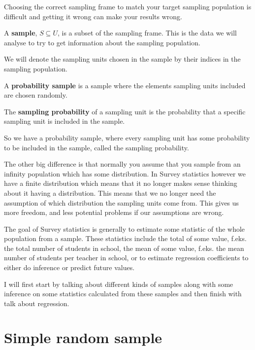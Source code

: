 \documentclass{article}
\begin{document}
Choosing the correct sampling frame to match your target sampling population is
difficult and getting it wrong can make your results wrong.


\begin{definition} \label{def:sample}
A \textbf{sample}, $S \subseteq U$, is a subset of the sampling frame. This is the data we will analyse to try to get information about the sampling population.
\end{definition}

We will denote the sampling units chosen in the sample by their indices in the
sampling population.

\begin{definition} \label{def:probSample}
A \textbf{probability sample} is a sample where the elements sampling units included are chosen randomly.
\end{definition}

\begin{definition} \label{def:sampProb}
The \textbf{sampling probability} of a sampling unit is the probability that a specific sampling unit is included in the sample.
\end{definition}

So we have a probability sample, where every sampling unit has some probability to be included in the sample, called the sampling probability.


The other big difference is that normally you assume that you sample from an
infinity population which has some distribution. In Survey statistics however we
have a finite distribution which means that it no longer makes sense thinking
about it having a distribution. This means that we no longer need the assumption
of which distribution the sampling units come from. This gives us more freedom,
and less potential problems if our assumptions are wrong.


The goal of Survey statistics is generally to estimate some statistic of the whole
population from a sample. These statistics include the total of some value,
f.eks. the total number of students in school, the mean of some value, f.eks.
the mean number of students per teacher in school, or to estimate regression
coefficients to either do inference or predict future values.

I will first start by talking about different kinds of samples along with some
inference on some statistics calculated from these samples and then finish with
talk about regression.

\section{Simple random sample}
\end{document}
